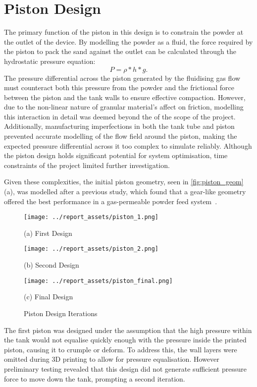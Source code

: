 \section{Piston Design}\label{sec:piston}
The primary function of the piston in this design is to constrain the powder at the outlet of the device. By modelling the powder as a fluid, the force required by the piston to pack the sand against the outlet can be calculated through the hydrostatic pressure equation: 
\[
P = \rho * h * g.
\]
The pressure differential across the piston generated by the fluidising gas flow must counteract both this pressure from the powder and the frictional force between the piston and the tank walls to ensure effective compaction. However, due to the non-linear nature of granular material's affect on friction, modelling this interaction in detail was deemed beyond the of the scope of the project. Additionally, manufacturing imperfections in both the tank tube and piston prevented accurate modelling of the flow field around the piston, making the expected pressure differential across it too complex to simulate reliably. Although the piston design holds significant potential for system optimisation, time constraints of the project limited further investigation.

Given these complexities, the initial piston geometry, seen in \autoref{fig:piston_geom} (a), was modelled after a previous study, which found that a gear-like geometry offered the best performance in a gas-permeable powder feed system~\cite{TANG2023118406}. 
\begin{figure}[htbp]
    \centering
    
    \begin{minipage}{0.29\textwidth}
        \centering
        \texttt{[image: ../report\_assets/piston\_1.png]}
        \caption*{(a) First Design}\label{fig:piston_geom_1}
    \end{minipage}
    \hfill
    \begin{minipage}{0.29\textwidth}
        \centering
        \texttt{[image: ../report\_assets/piston\_2.png]}
        \caption*{(b) Second Design}\label{fig:piston_geom_2}
    \end{minipage}
    \hfill
    \begin{minipage}{0.29\textwidth}
        \centering
        \texttt{[image: ../report\_assets/piston\_final.png]}
        \caption*{(c) Final Design}\label{fig:piston_geom_3}
    \end{minipage}
    \caption{Piston Design Iterations}\label{fig:piston_geom}
\end{figure}
The first piston was designed under the assumption that the high pressure within the tank would not equalise quickly enough with the pressure inside the printed piston, causing it to crumple or deform. To address this, the wall layers were omitted during 3D printing to allow for pressure equalisation. However preliminary testing revealed that this design did not generate sufficient pressure force to move down the tank, prompting a second iteration.

